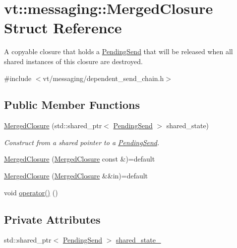\hypertarget{structvt_1_1messaging_1_1_merged_closure}{}\section{vt\+:\+:messaging\+:\+:Merged\+Closure Struct Reference}
\label{structvt_1_1messaging_1_1_merged_closure}


A copyable closure that holds a {\ttfamily \hyperlink{structvt_1_1messaging_1_1_pending_send}{Pending\+Send}} that will be released when all shared instances of this closure are destroyed.  




{\ttfamily \#include $<$vt/messaging/dependent\+\_\+send\+\_\+chain.\+h$>$}

\subsection*{Public Member Functions}
\begin{DoxyCompactItemize}
\item 
\hyperlink{structvt_1_1messaging_1_1_merged_closure_aa860c8bc95d88534a9f8a6b733e377c9}{Merged\+Closure} (std\+::shared\+\_\+ptr$<$ \hyperlink{structvt_1_1messaging_1_1_pending_send}{Pending\+Send} $>$ shared\+\_\+state)
\begin{DoxyCompactList}\small\item\em Construct from a shared pointer to a {\ttfamily \hyperlink{structvt_1_1messaging_1_1_pending_send}{Pending\+Send}}. \end{DoxyCompactList}\item 
\hyperlink{structvt_1_1messaging_1_1_merged_closure_ab21e88def46380f5e1b70cf4211cd511}{Merged\+Closure} (\hyperlink{structvt_1_1messaging_1_1_merged_closure}{Merged\+Closure} const \&)=default
\item 
\hyperlink{structvt_1_1messaging_1_1_merged_closure_adba4d99af20e97930a0897a2b2610c02}{Merged\+Closure} (\hyperlink{structvt_1_1messaging_1_1_merged_closure}{Merged\+Closure} \&\&in)=default
\item 
void \hyperlink{structvt_1_1messaging_1_1_merged_closure_abc86a14e2fed26386742c9604d213676}{operator()} ()
\end{DoxyCompactItemize}
\subsection*{Private Attributes}
\begin{DoxyCompactItemize}
\item 
std\+::shared\+\_\+ptr$<$ \hyperlink{structvt_1_1messaging_1_1_pending_send}{Pending\+Send} $>$ \hyperlink{structvt_1_1messaging_1_1_merged_closure_a5e595776f26d0b403464bbe3b94b3329}{shared\+\_\+state\+\_\+}
\end{DoxyCompactItemize}


